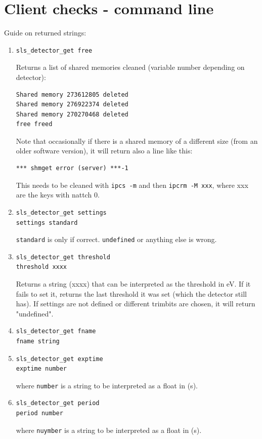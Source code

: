 \documentclass{article}
\begin{document}
{{{\section{Client checks - command line}

Guide on returned strings:
\begin{enumerate}
\item \begin{verbatim}
sls_detector_get free
\end{verbatim}
Returns a list of shared memories cleaned (variable number depending on detector):
\begin{verbatim}
Shared memory 273612805 deleted
Shared memory 276922374 deleted
Shared memory 270270468 deleted
free freed
\end{verbatim}
Note that occasionally if there is a shared memory of a different size (from an older software version), it will return also a line like this:
\begin{verbatim}
*** shmget error (server) ***-1
\end{verbatim}
This needs to be cleaned with {\tt{ipcs -m}} and then {\tt{ipcrm -M xxx}}, where xxx are the keys with nattch 0. 
\item \begin{verbatim}sls_detector_get settings
settings standard
\end{verbatim} 
{\tt{standard}} is only if correct. {\tt{undefined}} or anything else is wrong. 

\item \begin{verbatim}
sls_detector_get threshold
threshold xxxx
\end{verbatim}
Returns a string (xxxx) that can be interpreted as the threshold in eV. If it fails to set it, returns the last threshold it was set (which the detector still has). If settings are not defined or different trimbits are chosen, it will return "undefined".

\item \begin{verbatim}
sls_detector_get fname
fname string
\end{verbatim}

\item \begin{verbatim}
sls_detector_get exptime
exptime number
\end{verbatim}
where {\tt{number}} is a string to be interpreted as a float in (s). 

\item \begin{verbatim}
sls_detector_get period
period number
\end{verbatim}
where {\tt{nuymber}} is a string to be interpreted as a float in (s). 


\end{enumerate}}}}
\end{document}
